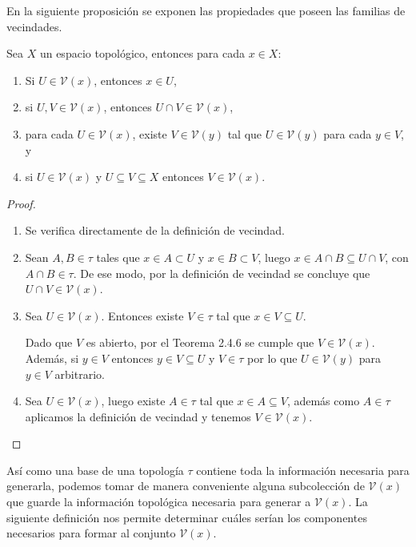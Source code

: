 En la siguiente proposición se exponen las propiedades que poseen las familias de vecindades.

\begin{proposicion}\label{pro:propiedadesSistemaVecindades}
Sea $X$ un espacio topológico, entonces para cada $x\in X$:
\begin{enumerate}
    \item Si $U\in\mathcal{V}(x)$, entonces $x\in U$,
    \item si $U,V\in\mathcal{V}(x)$, entonces $U\cap V\in\mathcal{V}(x)$,
    \item para cada $U\in\mathcal{V}(x)$, existe $V\in\mathcal{V}(y)$ tal que $U\in\mathcal{V}(y)$ para cada $y\in V$, y 
    \item si $U\in\mathcal{V}(x)$ y $U\subseteq V\subseteq X$ entonces $V\in\mathcal{V}(x)$.
\end{enumerate}
\end{proposicion}

\begin{proof} $$$$
\begin{enumerate}
    \item Se verifica directamente de la definición de vecindad. 
    \item Sean $A,B\in\tau$ tales que $x\in A\subset U$ y $x\in B\subset V$, luego $x\in A\cap B\subseteq U\cap V$, con $A\cap B\in\tau$. De ese modo, por la definición de vecindad se concluye que $U\cap V\in\mathcal{V}(x)$.
    \item Sea $U\in\mathcal{V}(x)$. Entonces existe $V\in\tau$ tal que $x\in V\subseteq U$.
    
    Dado que $V$ es abierto, por el Teorema 2.4.6 se cumple que $V\in\mathcal{V}(x)$. Además, si $y\in V$ entonces $y\in V\subseteq U$ y $V\in\tau$ por lo que $U\in\mathcal{V}(y)$ para $y\in V$ arbitrario.
    \item Sea $U\in\mathcal{V}(x)$, luego existe $A\in\tau$ tal que $x\in A\subseteq V$, además como $A\in\mathcal{\tau}$ aplicamos la definición de vecindad y tenemos $V\in\mathcal{V}(x)$.
\end{enumerate} 
\end{proof}

Así como una base de una topología $\tau$ contiene toda la información necesaria para generarla, podemos tomar de manera conveniente alguna subcolección de $\mathcal{V}(x)$ que guarde la información topológica necesaria para generar a $\mathcal{V}(x)$. La siguiente definición nos permite determinar cuáles serían los componentes necesarios para formar al conjunto $\mathcal{V}(x)$.

